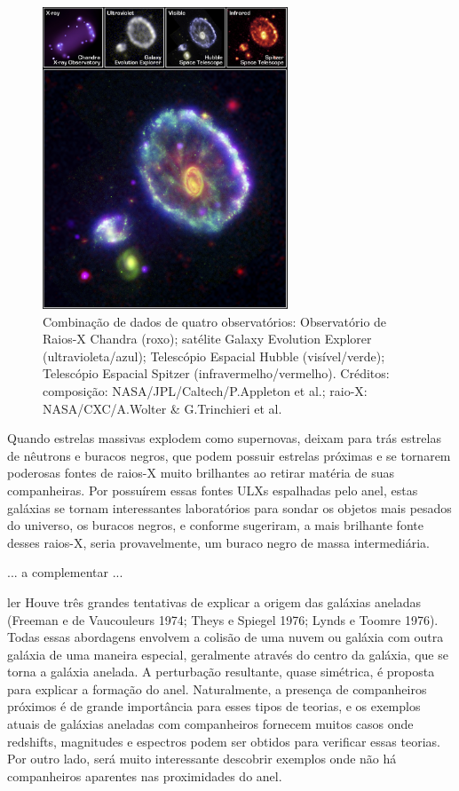 \begin{figure}[h]
  \centering 
  \includegraphics[width=0.65\textwidth]{Imagens/Cartwheel04.jpg} 
  \caption[Composição de imagens de Cartwheel.]{Combinação de dados de quatro observatórios: Observatório de Raios-X Chandra (roxo); satélite Galaxy Evolution Explorer (ultravioleta/azul); Telescópio Espacial Hubble (visível/verde); Telescópio Espacial Spitzer (infravermelho/vermelho). Créditos: composição: NASA/JPL/Caltech/P.Appleton et al.; raio-X: NASA/CXC/A.Wolter \& G.Trinchieri et al.}
  \label{fig:cart4} 
\end{figure}

Quando estrelas massivas explodem como supernovas, deixam para trás estrelas de nêutrons e buracos negros, que podem possuir estrelas próximas e se tornarem poderosas fontes de raios-X muito brilhantes ao retirar matéria de suas companheiras. Por possuírem essas fontes ULXs espalhadas pelo anel, estas galáxias se tornam interessantes laboratórios para sondar os objetos mais pesados do universo, os buracos negros, e conforme  sugeriram, a mais brilhante fonte desses raios-X, seria provavelmente, um buraco negro de massa intermediária.


 ... a complementar ...



ler
Houve três grandes tentativas de explicar a origem das galáxias aneladas (Freeman e de Vaucouleurs 1974; Theys e Spiegel 1976; Lynds e Toomre 1976). Todas essas abordagens envolvem a colisão de uma nuvem ou galáxia com outra galáxia de uma maneira especial, geralmente através do centro da galáxia, que se torna a galáxia anelada. A perturbação resultante, quase simétrica, é proposta para explicar a formação do anel. Naturalmente, a presença de companheiros próximos é de grande importância para esses tipos de teorias, e os exemplos atuais de galáxias aneladas com companheiros fornecem muitos casos onde redshifts, magnitudes e espectros podem ser obtidos para verificar essas teorias. Por outro lado, será muito interessante descobrir exemplos onde não há companheiros aparentes nas proximidades do anel. \cite{1987arpmadore}
